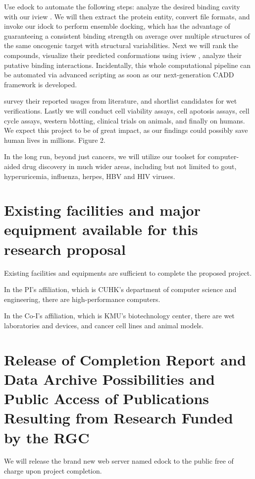 \documentclass[a4paper,12pt]{article}
\begin{document}
Use edock to automate the following steps: analyze the desired binding cavity with our iview \citep{1366}. We will then extract the protein entity, convert file formats, and invoke our idock \citep{1153} to perform ensemble docking, which has the advantage of guaranteeing a consistent binding strength on average over multiple structures of the same oncogenic target with structural variabilities. Next we will rank the compounds, visualize their predicted conformations using iview \citep{1366}, analyze their putative binding interactions. Incidentally, this whole computational pipeline can be automated via advanced scripting as soon as our next-generation CADD framework is developed.

survey their reported usages from literature, and shortlist candidates for wet verifications. Lastly we will conduct cell viability assays, cell apotosis assays, cell cycle assays, western blotting, clinical trials on animals, and finally on humans. We expect this project to be of great impact, as our findings could possibly save human lives in millions. Figure 2.

In the long run, beyond just cancers, we will utilize our toolset for computer-aided drug discovery in much wider areas, including but not limited to gout, hyperuricemia, influenza, herpes, HBV and HIV viruses.

\section*{Existing facilities and major equipment available for this research proposal}

Existing facilities and equipments are sufficient to complete the proposed project.

In the PI's affiliation, which is CUHK's department of computer science and engineering, there are high-performance computers.

In the Co-I's affiliation, which is KMU's biotechnology center, there are wet laboratories and devices, and cancer cell lines and animal models.

\section*{Release of Completion Report and Data Archive Possibilities and Public Access of Publications Resulting from Research Funded by the RGC}

We will release the brand new web server named edock to the public free of charge upon project completion.
\end{document}
